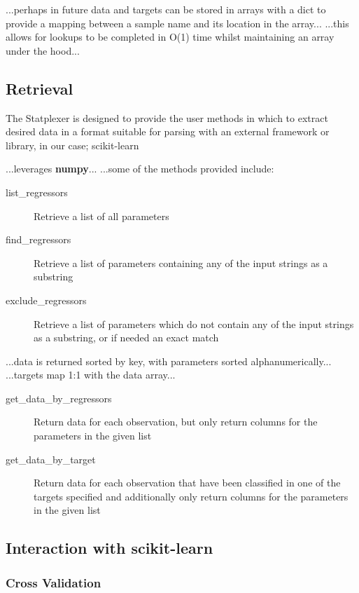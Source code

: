 ...perhaps in future data and targets can be stored in arrays with a dict to
provide a mapping between a sample name and its location in the array...
...this allows for lookups to be completed in O(1) time whilst maintaining an
array under the hood...


\subsection{Retrieval}
The Statplexer is designed to provide the user methods in which to extract
desired data in a format suitable for parsing with an external framework or
library, in our case; scikit-learn

...leverages \textbf{numpy}...
...some of the methods provided include:

\begin{description}
    \item[list\_regressors] Retrieve a list of all parameters
    \item[find\_regressors] Retrieve a list of parameters containing any of the
        input strings as a substring
    \item[exclude\_regressors] Retrieve a list of parameters which do not
        contain any of the input strings as a substring, or if needed an exact
        match
\end{description}

...data is returned sorted by key, with parameters sorted alphanumerically...
...targets map 1:1 with the data array...

\begin{description}
    \item[get\_data\_by\_regressors] Return data for each observation, but only
        return columns for the parameters in the given list
    \item[get\_data\_by\_target] Return data for each observation that have been
        classified in one of the targets specified and additionally only
        return columns for the parameters in the given list
\end{description}

\subsection{Interaction with scikit-learn}
\subsubsection{Cross Validation}

